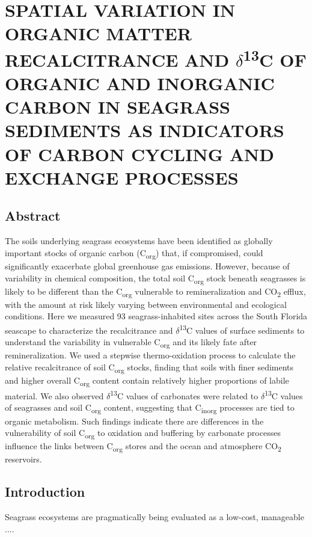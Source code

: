 \chapter{SPATIAL VARIATION IN ORGANIC MATTER RECALCITRANCE AND $\delta$\textsuperscript{13}C OF ORGANIC AND INORGANIC CARBON IN SEAGRASS SEDIMENTS AS INDICATORS OF CARBON CYCLING AND EXCHANGE PROCESSES}		\label{another chapter}

\section{Abstract}

The soils underlying seagrass ecosystems have been identified as globally important stocks of organic carbon (C\textsubscript{org}) that, if compromised, could significantly exacerbate global greenhouse gas emissions. However, because of variability in chemical composition, the total soil C\textsubscript{org} stock beneath seagrasses is likely to be different than the C\textsubscript{org} vulnerable to remineralization and CO\textsubscript{2} efflux, with the amount at risk likely varying between environmental and ecological conditions. Here we measured 93 seagrass-inhabited sites across the South Florida seascape to characterize the recalcitrance and $\delta$\textsuperscript{13}C values of surface sediments to understand the variability in vulnerable C\textsubscript{org} and its likely fate after remineralization. We used a stepwise thermo-oxidation process to calculate the relative recalcitrance of soil C\textsubscript{org} stocks, finding that soils with finer sediments and higher overall C\textsubscript{org} content contain relatively higher proportions of labile material. We also observed $\delta$\textsuperscript{13}C values of carbonates were related to $\delta$\textsuperscript{13}C values of seagrasses and soil C\textsubscript{org} content, suggesting that C\textsubscript{inorg} processes are tied to organic metabolism. Such findings indicate there are differences in the vulnerability of soil C\textsubscript{org} to oxidation and buffering by carbonate processes influence the links between C\textsubscript{org} stores and the ocean and atmosphere CO\textsubscript{2} reservoirs.



\section{Introduction}

Seagrass ecosystems are pragmatically being evaluated as a low-cost, manageable ....


